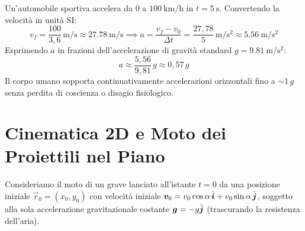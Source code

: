 \begin{esempio}
Un'automobile sportiva accelera da $0$ a $\SI{100}{\kilo\metre\per\hour}$ in $t = \SI{5}{\second}$.
Convertendo la velocità in unità SI:
\begin{equation}
    v_f = \frac{100}{3{,}6}\,\si{\metre\per\second} \approx \SI{27.78}{\metre\per\second} \implies a = \frac{v_f - v_0}{\Delta t} = \frac{27{,}78}{5}\,\si{\metre\per\second\squared} \approx \SI{5.56}{\metre\per\second\squared}
\end{equation}
Esprimendo $a$ in frazioni dell'accelerazione di gravità standard $g = \SI{9.81}{\metre\per\second\squared}$:
\begin{equation}
    a \approx \frac{5{,}56}{9{,}81}\,g \approx 0{,}57\,g
\end{equation}
Il corpo umano sopporta continuativamente accelerazioni orizzontali fino a $\sim 1\,g$ senza perdita di coscienza o disagio fisiologico.
\end{esempio}

\section{Cinematica 2D e Moto dei Proiettili nel Piano}
\label{sec:moto_proiettile}

Consideriamo il moto di un grave lanciato all'istante $t=0$ da una posizione iniziale $\vec{r}_0 = (x_0, y_0)$ con velocità iniziale $\bm{v}_0 = v_0\cos\alpha\,\hat{\bm{i}} + v_0\sin\alpha\,\hat{\bm{j}}$, soggetto alla sola accelerazione gravitazionale costante $\bm{g} = -g\hat{\bm{j}}$ (trascurando la resistenza dell'aria).

